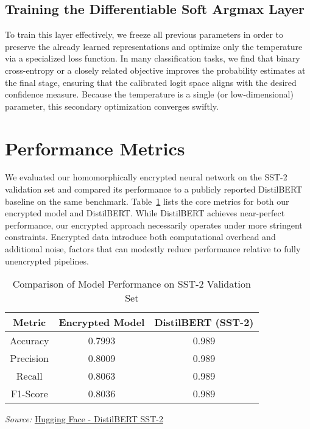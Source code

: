 \documentclass{article}
\begin{document}
\subsection{Training the Differentiable Soft Argmax Layer}

To train this layer effectively, we freeze all previous parameters in order to preserve the already learned representations and optimize only the temperature via a specialized loss function. In many classification tasks, we find that binary cross-entropy or a closely related objective improves the probability estimates at the final stage, ensuring that the calibrated logit space aligns with the desired confidence measure. Because the temperature is a single (or low-dimensional) parameter, this secondary optimization converges swiftly.


\section{Performance Metrics}

We evaluated our homomorphically encrypted neural network on the SST-2 validation set \cite{socher2013recursive} and compared its performance to a publicly reported DistilBERT baseline on the same benchmark. Table~\ref{tab:performance_comparison} lists the core metrics for both our encrypted model and DistilBERT. While DistilBERT achieves near-perfect performance, our encrypted approach necessarily operates under more stringent constraints. Encrypted data introduce both computational overhead and additional noise, factors that can modestly reduce performance relative to fully unencrypted pipelines.


\begin{table}[h]
    \centering
   
    \label{tab:performance_comparison}
    \begin{tabular}{|c|c|c|}
        \hline
        \textbf{Metric} & \textbf{Encrypted Model} & \textbf{DistilBERT (SST-2)} \\
        \hline
        Accuracy  & 0.7993  & 0.989  \\
        Precision & 0.8009  & 0.989  \\
        Recall    & 0.8063  & 0.989  \\
        F1-Score  & 0.8036  & 0.989  \\
        \hline
    \end{tabular}
    \caption{Comparison of Model Performance on SST-2 Validation Set}
    \textit{Source:} \href{https://huggingface.co/distilbert/distilbert-base-uncased-finetuned-sst-2-english}{Hugging Face - DistilBERT SST-2}
\end{table}
\end{document}
